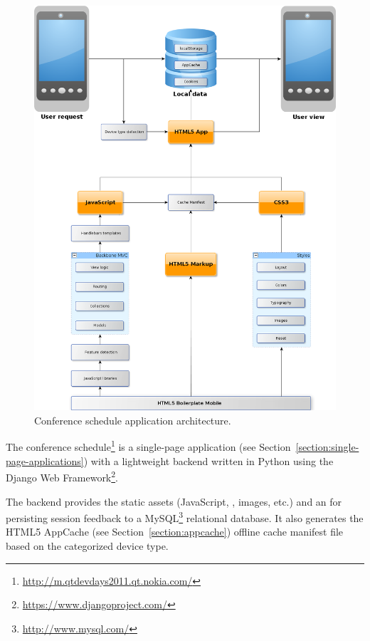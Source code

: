 \begin{figure}[ht]
  \begin{center}
    \includegraphics[width=\textwidth]{images/devdays.png}
    \caption{Conference schedule application architecture.}
    \label{figure:devdays.png}
  \end{center}
\end{figure}

The conference
schedule\footnote{\url{http://m.qtdevdays2011.qt.nokia.com/}} is a
single-page application (see
Section~\ref{section:single-page-applications}) with a lightweight
backend written in Python using the Django Web
Framework\footnote{\url{https://www.djangoproject.com/}}.

The backend provides the static assets (JavaScript, ,
images, etc.) and an  for persisting session feedback to a
MySQL\footnote{\url{http://www.mysql.com/}} relational database. It
also generates the HTML5 AppCache (see Section~\ref{section:appcache})
offline cache manifest file based on the categorized device type.

